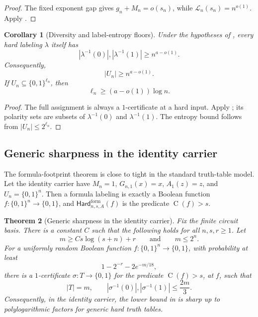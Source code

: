\documentclass[11pt]{article}
\newtheorem{theorem}{Theorem}[section]
\newtheorem{corollary}[theorem]{Corollary}
\theoremstyle{definition}
\newcommand{\bits}{\{0,1\}}
\newcommand{\Ckt}{\operatorname{C}}
\newcommand{\HardF}{\mathsf{Hard}^{\mathrm{form}}}
\begin{document}
\begin{proof}
The fixed exponent gap gives $g_n+M_n=o(s_n)$, while $\mathcal L_n(s_n)=n^{o(1)}$.  Apply .
\end{proof}

\begin{corollary}[Diversity and label-entropy floors]\label{cor:diversity}
Under the hypotheses of , every hard labeling $\lambda$ itself has
\[
  |\lambda^{-1}(0)|,|\lambda^{-1}(1)|\ge n^{a-o(1)}.
\]
Consequently,
\[
  |U_n|\ge n^{a-o(1)}.
\]
If $U_n\subseteq\bits^{\ell_n}$, then
\[
  \ell_n\ge(a-o(1))\log n.
\]
\end{corollary}

\begin{proof}
The full assignment is always a $1$-certificate at a hard input.  Apply ; its polarity sets are subsets of $\lambda^{-1}(0)$ and $\lambda^{-1}(1)$.  The entropy bound follows from $|U_n|\le2^{\ell_n}$.
\end{proof}

\subsection{Generic sharpness in the identity carrier}

The formula-footprint theorem is close to tight in the standard truth-table model.  Let the identity carrier have \(M_n=1\), \(G_{n,1}(x)=x\), \(A_1(z)=z\), and \(U_n=\bits^n\).  Then a formula labeling is exactly a Boolean function \(f:\bits^n\to\bits\), and \(\HardF_{n,s,A}(f)\) is the predicate \(\Ckt(f)>s\).

\begin{theorem}[Generic sharpness in the identity carrier]\label{thm:identity-generic-sharpness}
Fix the finite circuit basis.  There is a constant \(C\) such that the following holds for all \(n,s,r\ge1\).  Let
\[
  m\ge C s\log(s+n)+r
  \qquad\text{and}\qquad
  m\le 2^n.
\]
For a uniformly random Boolean function \(f:\bits^n\to\bits\), with probability at least
\[
  1-2^{-r}-2e^{-m/18},
\]
there is a \(1\)-certificate \(\sigma:T\to\bits\) for the predicate \(\Ckt(f)>s\), at \(f\), such that
\[
  |T|=m,
  \qquad
  |\sigma^{-1}(0)|,|\sigma^{-1}(1)|\le \frac{2m}{3}.
\]
Consequently, in the identity carrier, the lower bound in  is sharp up to polylogarithmic factors for generic hard truth tables.
\end{theorem}
\end{document}

